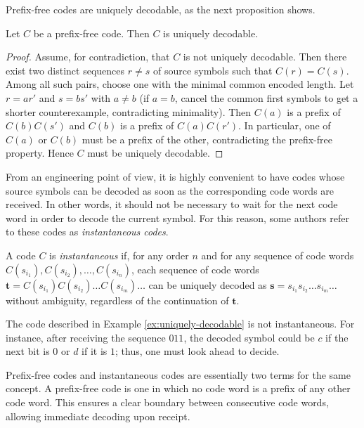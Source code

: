Prefix-free codes are uniquely decodable, as the next proposition shows.

\begin{proposition}
Let $C$ be a prefix-free code. Then $C$ is uniquely decodable.
\end{proposition}
\begin{proof}
Assume, for contradiction, that $C$ is not uniquely decodable. Then there exist two distinct sequences $r \neq s$ of source symbols such that $C(r)=C(s)$. Among all such pairs, choose one with the minimal common encoded length. Let $r = a r'$ and $s = b s'$ with $a \neq b$ (if $a=b$, cancel the common first symbols to get a shorter counterexample, contradicting minimality). Then $C(a)$ is a prefix of $C(b)C(s')$ and $C(b)$ is a prefix of $C(a)C(r')$. In particular, one of $C(a)$ or $C(b)$ must be a prefix of the other, contradicting the prefix-free property. Hence $C$ must be uniquely decodable.
\end{proof}

From an engineering point of view, it is highly convenient to have codes whose source symbols can be decoded as soon as the corresponding code words are received. In other words, it should not be necessary to wait for the next code word in order to decode the current symbol. For this reason, some authors refer to these codes as \emph{instantaneous codes}.

\begin{definition}
A code $C$ is \emph{instantaneous} if, for any order $n$ and for any sequence of code words $C(s_{i_1}), C(s_{i_2}), \ldots, C(s_{i_n})$, each sequence of code words $\mathbf{t} = C(s_{i_1})C(s_{i_2})\ldots C(s_{i_m})\ldots$ can be uniquely decoded as $\mathbf{s} = s_{i_1}s_{i_2}\ldots s_{i_m}\ldots$ without ambiguity, regardless of the continuation of $\mathbf{t}$.
\end{definition}

\begin{example}
The code described in Example \ref{ex:uniquely-decodable} is not instantaneous. For instance, after receiving the sequence $011$, the decoded symbol could be $c$ if the next bit is $0$ or $d$ if it is $1$; thus, one must look ahead to decide.
\end{example}

Prefix-free codes and instantaneous codes are essentially two terms for the same concept. A prefix-free code is one in which no code word is a prefix of any other code word. This ensures a clear boundary between consecutive code words, allowing immediate decoding upon receipt.

